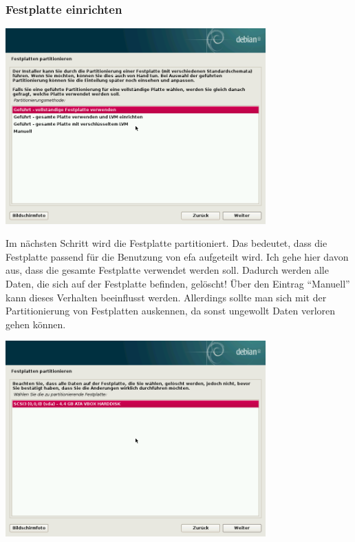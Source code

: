\documentclass[a4paper,12pt,twoside]{article}
\begin{document}
\subsubsection{Festplatte einrichten}
\label{sct:inst_festplatte}

\begin{minipage}{\linewidth}
    \centering
    \includegraphics[width=10cm]{screenshots/select_partitioning.png}
    \label{fig:partitionierung}
\end{minipage}
\bigskip

Im nächsten Schritt wird die Festplatte partitioniert. Das bedeutet,
dass die Festplatte passend für die Benutzung von efa aufgeteilt wird.
Ich gehe hier davon aus, dass die gesamte Festplatte verwendet werden
soll. Dadurch werden alle Daten, die sich auf der Festplatte befinden,
gelöscht! Über den Eintrag "`Manuell"' kann
dieses Verhalten beeinflusst werden. Allerdings sollte man sich mit der
Partitionierung von Festplatten auskennen, da sonst ungewollt Daten
verloren gehen können.

\begin{minipage}{\linewidth}
    \centering
    \includegraphics[width=10cm]{screenshots/select_drive.png}
    \label{fig:auswahl_festplatte}
\end{minipage}
\end{document}
